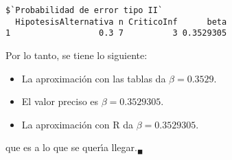 \begin{solucion}
\begin{enumerate}
  \begin{verbatim}
$`Probabilidad de error tipo II`
  HipotesisAlternativa n CriticoInf      beta
1                  0.3 7          3 0.3529305
  \end{verbatim}
  \vspace{-0.5cm}
  Por lo tanto, se tiene lo siguiente:
  \begin{itemize}
   \item La aproximaci\'on con las tablas da $\beta = 0.3529$.
   \item El valor preciso es $\beta = 0.3529305$.
   \item La aproximaci\'on con R da $\beta = 0.3529305$.
  \end{itemize}
  que es a lo que se quer\'{\i}a llegar.${}_{\blacksquare}$
 \end{enumerate}
\end{solucion}
